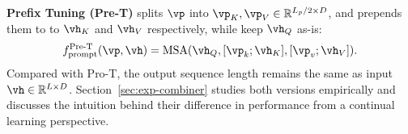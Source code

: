 \documentclass[runningheads]{llncs}
\newcommand{\method}{DualPrompt\xspace}
\newcommand{\gprompt}{G-Prompt\xspace}
\newcommand{\eprompt}{E-Prompt\xspace}
\def \iep{\texttt{start}_{\ve}}
\def \jep{\texttt{end}_{\ve}}
\def \igp{\texttt{start}_{\vg}}
\def \jgp{\texttt{end}_{\vg}}
\begin{document}
\textbf{Prefix Tuning (Pre-T)} splits $\vp$ into $\vp_K, \vp_V \in \mathbb{R}^{L_p/2 \times D}$, and prepends them to to $\vh_K$ and $\vh_V$ respectively, while keep $\vh_Q$ as-is:
\begin{equation}
f_{\operatorname{prompt}}^{\operatorname{{Pre-T}}}(\vp, \vh) = \operatorname{ MSA }(\vh_Q, [\vp_k;\vh_K], [\vp_v;\vh_V]).  
\end{equation}
Compared with Pro-T, the output sequence length remains the same as input $\vh \in \mathbb{R}^{L \times D}$. 
Section~\ref{sec:exp-combiner} studies both versions empirically and discusses the intuition behind their difference in performance from a continual learning perspective. 

\end{document}
